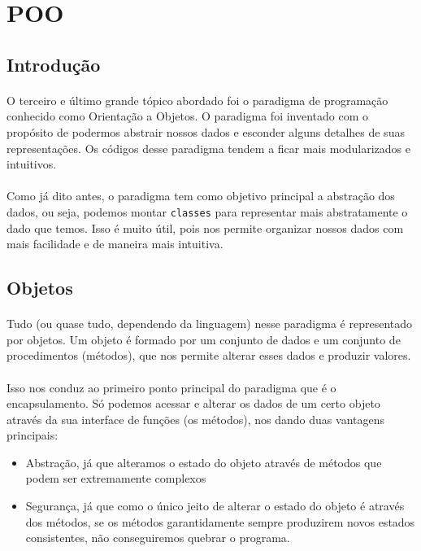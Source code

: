 \documentclass[11pt]{article}
\begin{document}
\section{POO}
\label{sec:orgacdf131}
\subsection{Introdução}
\label{sec:org990f2d6}
\paragraph{} O terceiro e último grande tópico abordado foi o paradigma de programação conhecido como Orientação a Objetos. O paradigma foi
inventado com o propósito de podermos abstrair nossos dados e esconder alguns detalhes de suas representações. Os códigos desse paradigma
tendem a ficar mais modularizados e intuitivos.

\paragraph{} Como já dito antes, o paradigma tem como objetivo principal a abstração dos dados, ou seja, podemos montar \texttt{classes} para
representar mais abstratamente o dado que temos. Isso é muito útil, pois nos permite organizar nossos dados com mais facilidade e de
maneira mais intuitiva.

\subsection{Objetos}
\label{sec:org92f3d6d}
\paragraph{} Tudo (ou quase tudo, dependendo da linguagem) nesse paradigma é representado por objetos. Um objeto é formado por um conjunto
de dados e um conjunto de procedimentos (métodos), que nos permite alterar esses dados e produzir valores.

\paragraph{} Isso nos conduz ao primeiro ponto principal do paradigma que é o encapsulamento. Só podemos acessar e alterar os dados de um
certo objeto através da sua interface de funções (os métodos), nos dando duas vantagens principais:

\begin{itemize}
\item Abstração, já que alteramos o estado do objeto através de métodos que podem ser extremamente complexos
\item Segurança, já que como o único jeito de alterar o estado do objeto é através dos métodos, se os métodos garantidamente sempre produzirem novos estados consistentes, não conseguiremos quebrar o programa.
\end{itemize}
\end{document}
